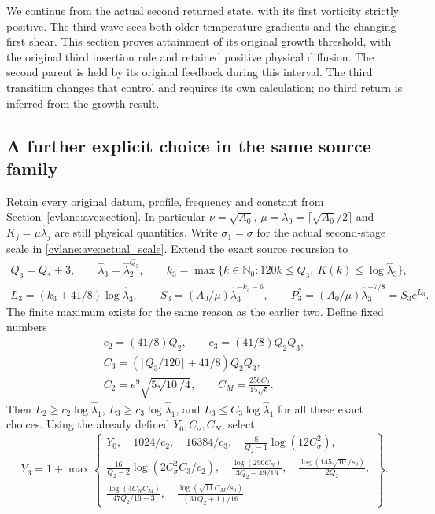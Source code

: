 We continue from the actual second returned state, with its first
vorticity strictly positive. The third wave sees both older temperature
gradients and the changing first shear. This section proves attainment
of its original growth threshold, with the original third insertion
rule and retained positive physical diffusion. The second parent is
held by its original feedback during this interval. The third
transition changes that control and requires its own calculation;
no third return is inferred from the growth result.

\subsection{A further explicit choice in the same source family}

Retain every original datum, profile, frequency and constant from
Section~\ref{cvlane:ave:section}. In particular $\nu=\sqrt{A_0}$,
$\mu=\lambda_0=\lceil\sqrt{A_0}/2\rceil$ and
$K_j=\mu\widehat\lambda_j$ are still physical quantities.
Write $\sigma_1=\sigma$ for the actual second-stage scale in
\eqref{cvlane:ave:actual_scale}. Extend the exact source recursion to
\begin{equation}\label{cvlane:tge:source}
\begin{gathered}
 Q_3=Q_*+3,\qquad
 \widehat\lambda_3=\widehat\lambda_2^{Q_3},\qquad
 k_3=\max\{k\in\mathbb N_0:120k\leq Q_3,
                         \ K(k)\leq\log\widehat\lambda_3\},\\
 L_3=(k_3+41/8)\log\widehat\lambda_3,\qquad
 S_3=(A_0/\mu)\widehat\lambda_3^{-k_3-6},\qquad
 P_3^*=(A_0/\mu)\widehat\lambda_3^{-7/8}=S_3e^{L_3}.
\end{gathered}
\end{equation}
The finite maximum exists for the same reason as the earlier two.
Define fixed numbers
\begin{gather*}
 c_2=(41/8)Q_2,\qquad c_3=(41/8)Q_2Q_3,\\
 C_3=(\lfloor Q_3/120\rfloor+41/8)Q_2Q_3,\\
 C_2=e^9\sqrt{5\sqrt{10}/4},\qquad
 C_M=\frac{256C_2}{15\sqrt e}.
\end{gather*}
Then $L_2\geq c_2\log\widehat\lambda_1$,
$L_3\geq c_3\log\widehat\lambda_1$, and
$L_3\leq C_3\log\widehat\lambda_1$ for all these exact choices.
Using the already defined $Y_0,C_\sigma,C_N$, select
\begin{equation}\label{cvlane:tge:Y3}
 Y_3=1+\max\left\{\begin{gathered}
 Y_0,\quad 1024/c_2,\quad 16384/c_3,\quad
 \frac8{Q_2-1}\log(12C_\sigma^2),\\
 \frac{16}{Q_2-2}\log(2C_\sigma^2C_3/c_2),\quad
 \frac{\log(290C_N)}{3Q_2-49/16},\quad
 \frac{\log(145\sqrt{10}/s_0)}{2Q_2},\\
 \frac{\log(4C_NC_M)}{47Q_2/16-3},\quad
 \frac{\log(\sqrt{11}C_M/s_0)}{(31Q_2+1)/16}
 \end{gathered}\right\}.
\end{equation}
